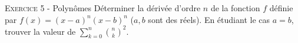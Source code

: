 \documentclass[11pt]{article}
\begin{document}


\vskip0.3cm\noindent\textsc{Exercice 5} - Polynômes
\vskip0.2cm
Déterminer la dérivée d'ordre $n$ de la fonction $f$ définie par $f(x)=(x-a)^n (x-b)^n$
($a,b$ sont des réels). En étudiant le cas $a=b$, trouver la valeur de $\sum_{k=0}^n \binom{n}{k}^2$.




\vskip0.5cm

\end{document}
